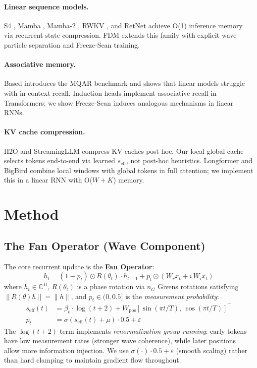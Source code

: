 \documentclass{article}
\begin{document}
\paragraph{Linear sequence models.}
S4 \citep{gu2022efficiently}, Mamba \citep{gu2023mamba},
Mamba-2 \citep{dao2024transformers}, RWKV \citep{peng2023rwkv},
and RetNet \citep{sun2023retnet} achieve O(1) inference memory via
recurrent state compression.
FDM extends this family with explicit wave-particle separation
and Freeze-Scan training.

\paragraph{Associative memory.}
Based \citep{arora2024simple} introduces the MQAR benchmark and shows
that linear models struggle with in-context recall.
Induction heads \citep{olsson2022context} implement associative recall
in Transformers; we show Freeze-Scan induces analogous mechanisms in
linear RNNs.

\paragraph{KV cache compression.}
H2O \citep{zhang2023h2o} and StreamingLLM \citep{xiao2023efficient}
compress KV caches post-hoc.
Our local-global cache selects tokens end-to-end via learned $s_\text{eff}$,
not post-hoc heuristics.
Longformer \citep{beltagy2020longformer} and
BigBird \citep{zaheer2020bigbird} combine local windows with global tokens
in full attention; we implement this in a linear RNN with O($W{+}K$) memory.

\section{Method}

\subsection{The Fan Operator (Wave Component)}

The core recurrent update is the \textbf{Fan Operator}:
\begin{equation}
  h_t = (1 - p_t) \odot R(\theta_t) \cdot h_{t-1}
        + p_t \odot (W_r x_t + i\, W_i x_t)
  \label{eq:fan}
\end{equation}
where $h_t \in \mathbb{C}^D$, $R(\theta_t)$ is a phase rotation via
$n_G$ Givens rotations satisfying $\|R(\theta)h\| = \|h\|$, and
$p_t \in (0, 0.5]$ is the \emph{measurement probability}:
\begin{align}
  s_\text{eff}(t) &= \beta_t \cdot \log(t{+}2)
    + W_\text{pos}[\sin(\pi t/T),\, \cos(\pi t/T)]^\top \\
  p_t &= \sigma(s_\text{eff}(t) + \mu) \cdot 0.5 + \varepsilon
\end{align}
The $\log(t{+}2)$ term implements \emph{renormalization group running}:
early tokens have low measurement rates (stronger wave coherence),
while later positions allow more information injection.
We use $\sigma(\cdot) \cdot 0.5 + \varepsilon$ (smooth scaling) rather than
hard clamping to maintain gradient flow throughout.
\end{document}
